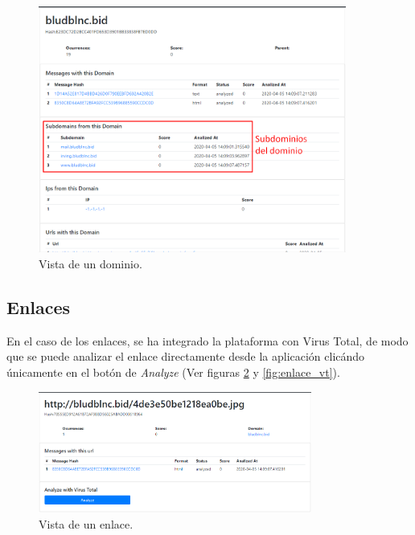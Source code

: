 \begin{figure}[htb]
    \centering
    \includegraphics[width=0.9\textwidth]{imagenes/capturasAplicacion/Dominio.png}
\caption{Vista de un dominio.}
\label{fig:dominio}
\end{figure}

\clearpage
\subsection{Enlaces} \label{vista_enlaces}
En el caso de los enlaces, se ha integrado la plataforma con Virus Total, de modo que se puede analizar el enlace directamente desde la aplicación clicándo únicamente en el botón de \textit{Analyze} (Ver figuras \ref{fig:enlace} y \ref{fig:enlace_vt}).

\begin{figure}[htb]
    \centering
    \includegraphics[width=0.8\textwidth]{imagenes/capturasAplicacion/Enlaces.png}
\caption{Vista de un enlace.}
\label{fig:enlace}
\end{figure}


